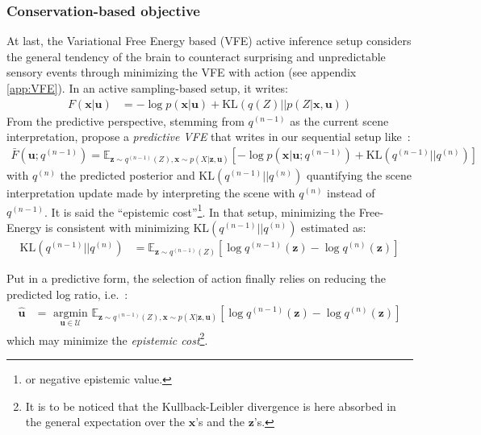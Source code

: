 \documentclass[12pt,twoside,openright]{article}
\begin{document}
\subsubsection{Conservation-based objective}\label{sec:conservation}

At last, the  Variational Free Energy based (VFE) active inference setup \citep{friston2010free,friston2012perceptions} 
considers the general tendency of the brain to counteract surprising and unpredictable sensory events through minimizing the VFE with action (see appendix \ref{app:VFE}). In an active sampling-based setup, it writes:
\begin{align}
F(\boldsymbol{x}|\boldsymbol{u}) 
&= -\log p(\boldsymbol{x}|\boldsymbol{u}) + \text{KL}(q(Z)||p(Z|\boldsymbol{x},\boldsymbol{u}))
\label{eq:FEP-posterior-u}
\end{align}
From the predictive perspective, stemming from $q^{(n-1)}$ as the current scene interpretation, \citet{friston2017active} propose a \emph{predictive VFE} that writes in our sequential setup like~:
\begin{align}
\bar{F}(\boldsymbol{u}; q^{(n-1)}) = \mathbb{E}_{\boldsymbol{z} \sim q^{(n-1)}(Z), \boldsymbol{x} \sim p(X|\boldsymbol{z}, \boldsymbol{u})}
\left[-\log p(\boldsymbol{x}| \boldsymbol{u}; q^{(n-1)}) + \text{KL}(q^{(n-1)}||q^{(n)})\right]
\label{eq:ELBO}
\end{align}
with $q^{(n)}$ the predicted posterior and $\text{KL}(q^{(n-1)}||q^{(n)})$ quantifying the {\color{Purple} scene interpretation update} made by interpreting  the scene with $q^{(n)}$ instead of $q^{(n-1)}$. {\color{Purple} It is said the ``epistemic cost''\footnote{or negative epistemic value.}}.
In that setup, minimizing the Free-Energy is consistent with minimizing $\text{KL}(q^{(n-1)}||q^{(n)})$
estimated as:
\begin{align*}
\text{KL}(q^{(n-1)}||q^{(n)})
&= \mathbb{E}_{\boldsymbol{z} \sim q^{(n-1)}(Z)} \left[\log q^{(n-1)}(\boldsymbol{z}) - \log q^{(n)}(\boldsymbol{z})\right]
\end{align*}

Put in a predictive form, the selection of action finally relies on reducing the predicted log ratio, i.e.~:
\begin{align}
\hat{\boldsymbol{u}} &= \underset{\boldsymbol{u} \in \mathcal{U}}{\text{ argmin }} \mathbb{E}_{\boldsymbol{z} \sim q^{(n-1)}(Z), \boldsymbol{x} \sim p(X|\boldsymbol{z}, \boldsymbol{u})}\left[\log q^{(n-1)}(\boldsymbol{z}) - \log q^{(n)}(\boldsymbol{z})\right]
\end{align}
which may {\color{Purple} minimize the \emph{epistemic cost}}\footnote{It is to be noticed  that the  Kullback-Leibler divergence is here absorbed in the general expectation over the $\boldsymbol{x}$'s and the $\boldsymbol{z}$'s.}.
\end{document}
